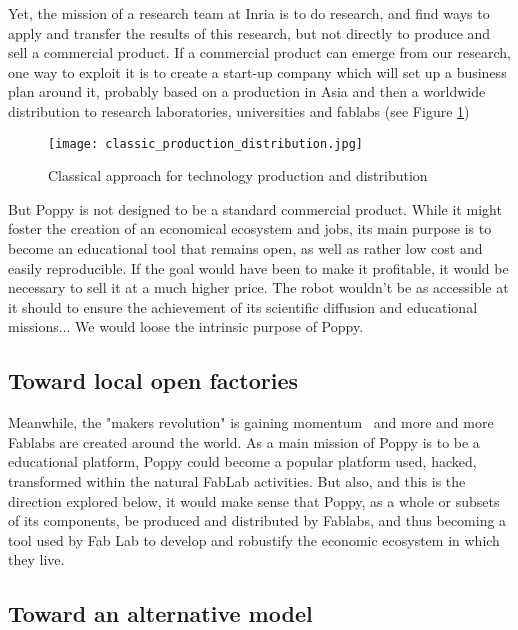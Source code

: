 Yet, the mission of a research team at Inria is to do research, and find ways to apply and transfer the results of this research, but not directly to produce and sell a commercial product. If a commercial product can emerge from our research, one way to exploit it is to create a start-up company which will set up a business plan around it, probably based on a production in Asia and then a worldwide distribution to research laboratories, universities and fablabs (see Figure \ref{fig:classic})

\begin{figure}[ht]
    \begin{center}
        \texttt{[image: classic\_production\_distribution.jpg]}
    \end{center}
    \caption{Classical approach for technology production and distribution}
    \label{fig:classic}
\end{figure}


But Poppy is not designed to be a standard commercial product. While it might foster the creation of an economical ecosystem and jobs, its main purpose is to become an educational tool that remains open, as well as rather low cost and easily reproducible. If the goal would have been to make it profitable, it would be necessary to sell it at a much higher price. The robot wouldn't be as accessible at it should to ensure the achievement of its scientific diffusion and educational missions... We would loose the intrinsic purpose of Poppy.

\subsection{Toward local open factories } %

Meanwhile, the "makers revolution" is gaining momentum~\parencite{anderson2012makers} and more and more Fablabs are created around the world. As a main mission of Poppy is to be a educational platform, Poppy could become a popular platform used, hacked, transformed within the natural FabLab activities. But also, and this is the direction explored below,  it would make sense that Poppy, as a whole or subsets of its components, be produced and distributed by Fablabs, and thus becoming a tool used by Fab Lab to develop and robustify the economic ecosystem in which they live.

\subsection{Toward an alternative model} %

